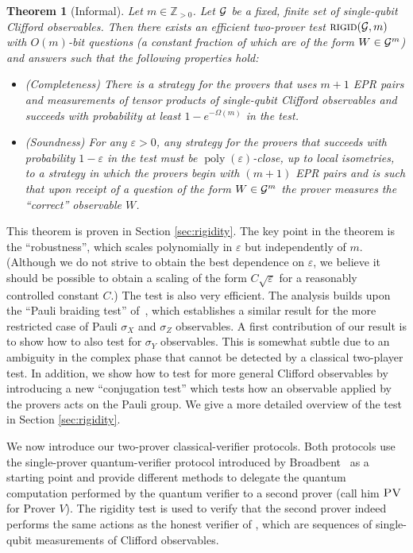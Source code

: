 \documentclass[11pt,letter]{article}
\newtheorem{theorem}{Theorem}
\theoremstyle{remark}
\theoremstyle{definition}
\DeclareMathOperator{\poly}{poly}
\newcommand{\eps}{\varepsilon}
\newcommand{\pv}{\textsc{PV}}
\begin{document}
\begin{theorem}[Informal]\label{thm:rigid-informal}
Let $m\in\mathbb{Z}_{>0}$. Let $\cal G$ be a fixed, finite set of single-qubit Clifford observables. Then there exists an efficient two-prover test $\textsc{rigid}({\cal G},m)$ with $O(m)$-bit questions (a constant fraction of which are of the form $W\in{\cal G}^m$) and answers such that the following properties hold:
\begin{itemize}
\item (Completeness) There is a strategy for the provers that uses $m+1$ EPR pairs and measurements of tensor products of single-qubit Clifford observables and succeeds with probability at least $1 - e^{-\Omega(m)}$ in the test.
\item (Soundness) For any $\eps>0$, any strategy for the provers that succeeds with probability $1-\eps$ in the test must be $\poly(\eps)$-close, up to local isometries, to a strategy in which the provers begin with $(m+1)$ EPR pairs and is such that upon receipt of a question of the form $W\in {\cal G}^m$ the prover measures the ``correct'' observable $W$. 
\end{itemize}
\end{theorem}


This theorem is proven in Section \ref{sec:rigidity}. The key point in the theorem is the ``robustness'', which scales polynomially in $\eps$ but independently of $m$. (Although we do not strive to obtain the best dependence on $\eps$, we believe it should be possible to obtain a scaling of the form $C\sqrt{\eps}$ for a reasonably controlled constant $C$.) The test is also very efficient. The analysis builds upon the ``Pauli braiding test'' of~\cite{natarajan2016robust}, which establishes a similar result for the more restricted case of Pauli $\sigma_X$ and $\sigma_Z$ observables. A first contribution of our result is to show how to also test for $\sigma_Y$ observables. This is somewhat subtle due to an ambiguity in the complex phase that cannot be detected by a classical two-player test. In addition, we show how to test for more general Clifford observables by introducing a new ``conjugation test'' which tests how an observable applied by the provers acts on the Pauli group. We give a more detailed overview of the test in  Section \ref{sec:rigidity}. 

\medskip

We now introduce our two-prover classical-verifier protocols. Both protocols use the single-prover quantum-verifier protocol introduced by Broadbent~\cite{broadbent15howtoverify} as a starting point and provide different methods to delegate the quantum computation performed by the quantum verifier to a second prover (call him $\pv$ for Prover $V$). The rigidity test is used to verify that the second prover indeed performs the same actions as the honest verifier of \cite{broadbent15howtoverify}, which are sequences of single-qubit measurements of Clifford observables. 
\end{document}
